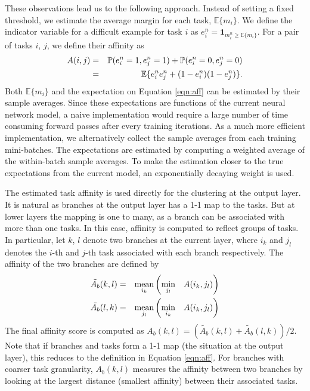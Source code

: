 \documentclass[10pt,twocolumn,letterpaper]{article}
\begin{document}
These observations lead us to the following approach. Instead of setting a fixed threshold, we estimate the average margin for each task, %
$\mathbb{E}\{m_i\}$. We define the indicator variable for a difficult example for task $i$ as $e_i^n = \mathbf{1}_{m_i^n \geq \mathbb{E}\{m_i\}}$.
For a pair of tasks $i$, $j$, we define their affinity as 
\begin{eqnarray}
\vspace{-1mm}
\label{eqn:aff}
A(i,j) & = & \mathbb{P}(e_i^n=1, e_j^n=1) + \mathbb{P}(e_i^n=0, e_j^n=0) \nonumber \\
& = & \mathbb{E}\{e_i^n e_j^n + (1-e_i^n)(1-e_j^n)\}.
\vspace{-1mm}
\end{eqnarray}
Both $\mathbb{E}\{m_i\}$ and the expectation on Equation \ref{eqn:aff} can be estimated by their sample averages. Since these expectations are functions of the current neural network model, a naive implementation would require a large number of time consuming forward passes after every training iterations. As a much more efficient implementation, we alternatively collect the sample averages from each training mini-batches. The expectations are estimated by computing a weighted average of the within-batch sample averages. To make the estimation closer to the true expectations from the current model, an exponentially decaying weight is used. 

The estimated task affinity is used directly for the clustering at the output layer. It is natural as branches at the output layer has a 1-1 map to the tasks. But at lower layers the mapping is one to many, as a branch can be associated with more than one tasks. In this case, affinity is computed to reflect groups of tasks. In particular, let $k$, $l$ denote two branches at the current layer, where $i_{k}$ and $j_{l}$ denotes the $i$-th and $j$-th task associated with each branch respectively. The affinity of the two branches are defined by
\begin{eqnarray}
\vspace{-1mm}
\label{eqn:between_sep}
\tilde{A_b}(k, l) &=& \underset{i_k}{\mbox{mean}}\left(\underset{j_l}{\min}\quad {A(i_{k}, j_{l})}\right) \\
\tilde{A_b}(l, k) &=& \underset{j_l}{\mbox{mean}}\left(\underset{i_k}{\min}\quad {A(i_{k}, j_{l})}\right)
\vspace{-1mm}
\end{eqnarray}
The final affinity score is computed as $A_b(k, l) = (\tilde{A_b}(k, l) + \tilde{A_b}(l, k))/2$.
Note that if branches and tasks form a 1-1 map (the situation at the output layer), %
this
reduces to the definition in Equation \ref{eqn:aff}. For branches with coarser task granularity, %
$A_b(k, l)$
measures the affinity between two branches by looking at the largest distance (smallest affinity) between their associated tasks.
\end{document}
